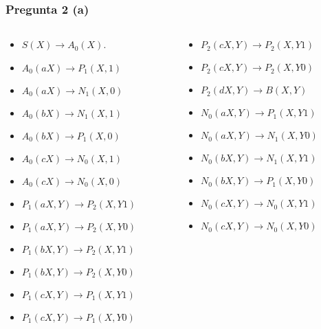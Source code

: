 \documentclass{beamer}
\begin{document}
\begin{frame}
    \frametitle{Pregunta 2 (a)}
    
    \begin{columns}
        \begin{column}{0.48\textwidth}
            \begin{itemize}
                \item $S(X)\to A_0(X)$.
                      
                \item $A_0(aX)\to P_1(X,1)$
                \item $A_0(aX)\to N_1(X,0)$
                \item $A_0(bX)\to N_1(X,1)$
                \item $A_0(bX)\to P_1(X,0)$
                \item $A_0(cX)\to N_0(X,1)$
                \item $A_0(cX)\to N_0(X,0)$
                      
                \item $P_1(aX,Y)\to P_2(X,Y1)$
                \item $P_1(aX,Y)\to P_2(X,Y0)$
                \item $P_1(bX,Y)\to P_2(X,Y1)$
                \item $P_1(bX,Y)\to P_2(X,Y0)$
                      
                \item $P_1(cX,Y)\to P_1(X,Y1)$
                \item $P_1(cX,Y)\to P_1(X,Y0)$
                      
            \end{itemize}
        \end{column}
        \begin{column}{0.48\textwidth}
            \begin{itemize}   
                \item $P_2(cX,Y)\to P_2(X,Y1)$
                \item $P_2(cX,Y)\to P_2(X,Y0)$
                \item $P_2(dX,Y)\to B(X,Y)$
                      
                \item $N_0(aX,Y)\to P_1(X,Y1)$
                \item $N_0(aX,Y)\to N_1(X,Y0)$
                \item $N_0(bX,Y)\to N_1(X,Y1)$
                \item $N_0(bX,Y)\to P_1(X,Y0)$
                \item $N_0(cX,Y)\to N_0(X,Y1)$
                \item $N_0(cX,Y)\to N_0(X,Y0)$
                      

\end{itemize}
\end{column}
\end{columns}
\end{frame}
\end{document}
